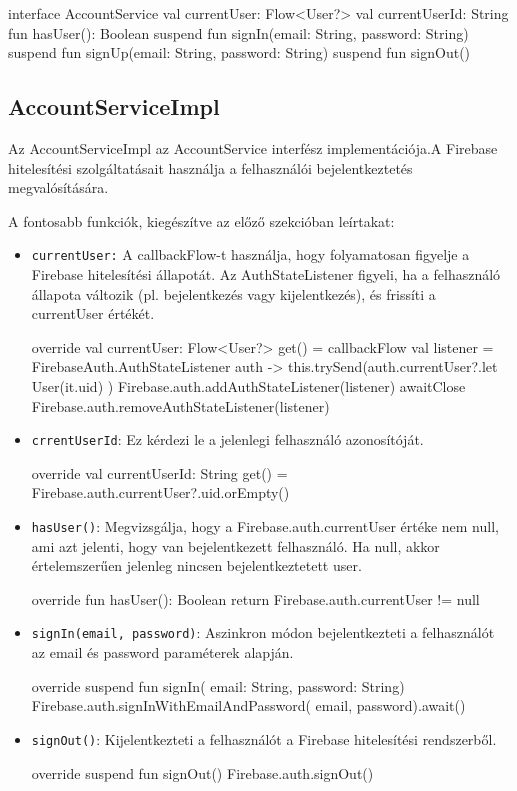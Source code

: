 \begin{java}[caption = {AccountService.kt}]
    interface AccountService {
    val currentUser: Flow<User?>
    val currentUserId: String
    fun hasUser(): Boolean
    suspend fun signIn(email: String, password: String)
    suspend fun signUp(email: String, password: String)
    suspend fun signOut()
}
\end{java}

\subsection{AccountServiceImpl}

Az AccountServiceImpl az AccountService interfész implementációja.A Firebase hitelesítési szolgáltatásait használja a felhasználói bejelentkeztetés megvalósítására.

A fontosabb funkciók, kiegészítve az előző szekcióban leírtakat:
\begin{itemize}
    \item \texttt{currentUser:} A callbackFlow-t használja, hogy folyamatosan figyelje a Firebase hitelesítési állapotát. Az AuthStateListener figyeli, ha a felhasználó állapota változik (pl. bejelentkezés vagy kijelentkezés), és frissíti a currentUser értékét.
    \begin{java}
override val currentUser: Flow<User?>
get() = callbackFlow {
    val listener =
        FirebaseAuth.AuthStateListener { auth ->
            this.trySend(auth.currentUser?.let {
                User(it.uid) })
        }
    Firebase.auth.addAuthStateListener(listener)
    awaitClose {
        Firebase.auth.removeAuthStateListener(listener) }
}
    \end{java}
    \newpage
    \item \texttt{crrentUserId}: Ez kérdezi le a jelenlegi felhasználó azonosítóját.
    \begin{java}
override val currentUserId: String
get() = Firebase.auth.currentUser?.uid.orEmpty()
    \end{java}
    \item \texttt{hasUser()}: Megvizsgálja, hogy a Firebase.auth.currentUser értéke nem null, ami azt jelenti, hogy van bejelentkezett felhasználó. Ha null, akkor értelemszerűen jelenleg nincsen bejelentkeztetett user.
    \begin{java}
override fun hasUser(): Boolean {
return Firebase.auth.currentUser != null
    }
    \end{java}
    \item \texttt{signIn(email, password)}: Aszinkron módon bejelentkezteti a felhasználót az email és password paraméterek alapján.
    \begin{java}
override suspend fun signIn(
email: String,
password: String) {
    Firebase.auth.signInWithEmailAndPassword(
    email, password).await()
}
    \end{java}
    \item \texttt{signOut()}: Kijelentkezteti a felhasználót a Firebase hitelesítési rendszerből.
    \begin{java}
override suspend fun signOut() {
Firebase.auth.signOut()
}
    \end{java}
\end{itemize}

